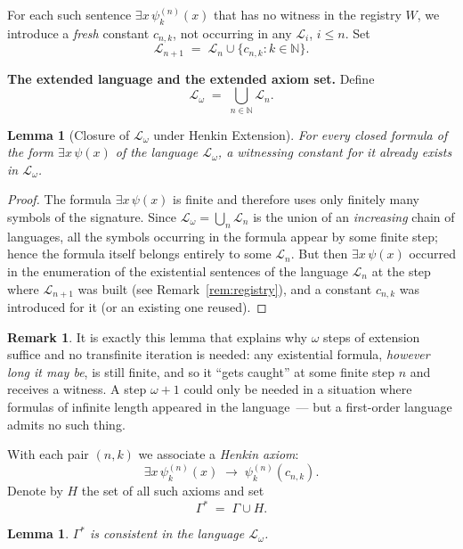 \documentclass[12pt, a4paper]{article}
\theoremstyle{plain}
\newtheorem{lemma}[theorem]{Lemma}
\theoremstyle{definition}
\newtheorem{remark}[theorem]{Remark}
\newcommand{\Lang}{\mathcal{L}}
\newcommand{\Lw}{\mathcal{L}_\omega}
\newcommand{\N}{\mathbb{N}}
\begin{document}
For each such sentence $\exists x\,\psi_k^{(n)}(x)$ that has no
witness in the registry $W$, we introduce a \emph{fresh} constant $c_{n,k}$,
not occurring in any $\Lang_i$, $i \le n$. Set
\[
  \Lang_{n+1} \;=\; \Lang_n \cup \bigl\{c_{n,k} : k \in \N\bigr\}.
\]

\textbf{The extended language and the extended axiom set.}
Define
\[
  \Lw \;=\; \bigcup_{n \in \N} \Lang_n.
\]

\begin{lemma}[Closure of $\Lw$ under Henkin Extension]\label{lem:omega-closed}
For every closed formula of the form $\exists x\,\psi(x)$ of the language $\Lw$,
a witnessing constant for it already exists in $\Lw$.
\end{lemma}

\begin{proof}
The formula $\exists x\,\psi(x)$ is finite and therefore uses only finitely
many symbols of the signature. Since $\Lw = \bigcup_n \Lang_n$ is the union of
an \emph{increasing} chain of languages, all the symbols occurring in the formula
appear by some finite step; hence the formula itself belongs entirely
to some $\Lang_n$. But then $\exists x\,\psi(x)$ occurred in the enumeration of
the existential sentences of the language $\Lang_n$
at the step where $\Lang_{n+1}$ was built (see Remark~\ref{rem:registry}),
and a constant $c_{n,k}$ was introduced for it (or an existing one
reused).
\end{proof}

\begin{remark}
It is exactly this lemma that explains why $\omega$ steps of extension suffice
and no transfinite iteration is needed: any existential formula,
\emph{however long it may be}, is still finite, and so it
``gets caught'' at some finite step $n$ and receives a witness. A step
$\omega+1$ could only be needed in a situation where formulas
of infinite length appeared in the language~--- but a first-order language admits
no such thing.
\end{remark}

With each pair $(n, k)$ we associate a \emph{Henkin axiom}:
\[
  \exists x\,\psi_k^{(n)}(x) \;\to\; \psi_k^{(n)}(c_{n,k}).
\]
Denote by $H$ the set of all such axioms and set
\[
  \Gamma^* \;=\; \Gamma \cup H.
\]

\begin{lemma}\label{lem:henkin-consistent}
$\Gamma^*$ is consistent in the language $\Lw$.
\end{lemma}
\end{document}
